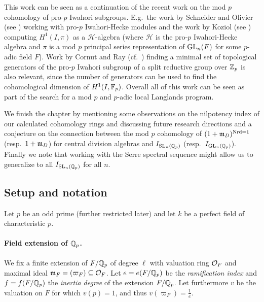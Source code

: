This work can be seen as a continuation of the recent work on the mod $p$ cohomology of pro-$p$ Iwahori subgroups. E.g.\ the work by Schneider and Olivier (see \cite{SchOll-modular,SchOll-torsion,Sch-smooth}) working with pro-$p$ Iwahori-Hecke modules and the work by Koziol (see \cite{Koziol}) computing $H^{1}(I,\pi)$ as a $\mathcal{H}$-algebra (where $\mathcal{H}$ is the pro-$p$ Iwahori-Hecke algebra and $\pi$ is a mod $p$ principal series representation of $\operatorname{GL}_{n}(F)$ for some $p$-adic field $F$). Work by Cornut and Ray (cf.\ \cite{Generators}) finding a minimal set of topological generators of the pro-$p$ Iwahori subgroup of a split reductive group over $\mathbb{Z}_{p}$ is also relevant, since the number of generators can be used to find the cohomological dimension of $H^{1}(I,\mathbb{F}_{p})$. Overall all of this work can be seen as part of the search for a mod $p$ and $p$-adic local Langlands program.

We finish the chapter by mentioning some observations on the nilpotency index of our calculated cohomology rings and discussing future research directions and a conjecture on the connection between the mod $p$ cohomology of $(1+\mathfrak{m}_{D})^{\operatorname{Nrd} = 1}$ (resp.\ $1+\mathfrak{m}_{D}$) for central division algebras and $I_{\operatorname{SL}_{n}(\mathbb{Q}_{p})}$ (resp.\ $I_{\operatorname{GL}_{n}(\mathbb{Q}_{p})}$). Finally we note that working with the Serre spectral sequence might allow us to generalize to all $I_{\operatorname{SL}_{n}(\mathbb{Q}_{p})}$ for all $n$.


\subsection{Setup and notation}%
\label{subsec:setup-iwa}

Let $p$ be an odd prime (further restricted later) and let $k$ be a perfect field of characteristic $p$.

\paragraph{Field extension of $\mathbb{Q}_{p}$.} We fix a finite extension of $F/\mathbb{Q}_{p}$ of degree $\ell$ with valuation ring $\mathcal{O}_{F}$ and maximal ideal $\mathfrak{m}_{F} = (\varpi_{F}) \subseteq \mathcal{O}_{F}$. Let $e = e(F/\mathbb{Q}_{p})$ be the \emph{ramification index} and $f = f(F/\mathbb{Q}_{p})$ the \emph{inertia degree} of the extension $F/\mathbb{Q}_{p}$. Let furthermore $v$ be the valuation on $F$ for which $v(p) = 1$, and thus $v(\varpi_{F}) = \frac{1}{e}$.

